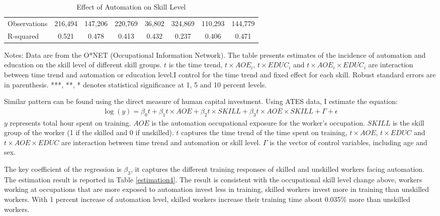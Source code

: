 \documentclass[12pt]{article}
\begin{document}
\begin{table}[h!]
\begin{center}
\begin{tabular}{lccccccc}
Observations & 216,494 & 147,206 & 220,769 & 36,802 & 324,869 & 110,293 & 144,779 \\
 R-squared & 0.521 & 0.478 & 0.413 & 0.432 & 0.237 & 0.406 & 0.471 \\ \hline
\end{tabular}
\end{center}
\caption{Effect of Automation on Skill Level}
\label{estimation3}
{\scriptsize Notes: Data are from the O*NET (Occupational Information Network). The table presents estimates of the incidence of automation and education on the skill level of different skill groups. $t$ is the time trend, $t\times AOE_{i}$, $t\times EDUC_{i}$ and $t\times AOE_{i}\times EDUC_{i}$ are interaction between time trend and automation or education level.I control for the time trend and fixed effect for each skill. Robust standard errors are in parenthesis. ***, **, * denotes statistical significance at 1, 5 and 10 percent levels.}
\end{table}

Similar pattern can be found using the direct measure of human capital investment. Using ATES data, I estimate the equation: 
\begin{align}
\log (y) = \beta_0 t +\beta_1 t \times AOE + \beta_2 t \times SKILL +\beta_3 t \times AOE \times SKILL + \Gamma + \epsilon
\end{align}
$y$ represents total hour spent on training. $AOE$ is the automation occupational exposure for the worker's occupation. $SKILL$ is the skill group of the worker (1 if the skilled and 0 if unskilled). $t$ captures the time trend of the time spent on training, $t\times AOE$, $t\times EDUC$ and $t\times AOE\times EDUC$ are interaction between time trend and automation or skill level. $\Gamma$ is the vector of control variables, including age and sex. 

The key coefficient of the regression is $\beta_3$, it captures the different training responses of skilled and unskilled workers facing automation. The estimation result is reported in Table \ref{estimation4}. The result is consistent with the occupational skill level change above, workers working at occupations that are more exposed to automation invest less in training, skilled workers invest more in training than unskilled workers. With 1 percent increase of automation level, skilled workers increase their training time about 0.035\% more than unskilled workers. 
\end{document}
